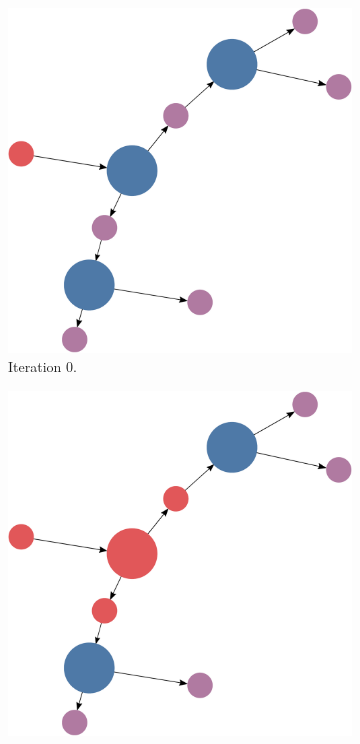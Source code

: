 \documentclass[titlepage,11pt]{article}
\begin{document}
\begin{figure}
	\begin{subfigure}[!htb]{0.32\textwidth}
		\centering
		\includegraphics[width=\columnwidth]{figures/knn_simple_forward_think_0.pdf}
		\caption{Iteration 0.}
	\end{subfigure}
	\begin{subfigure}[!htb]{0.32\textwidth}
		\centering
		\includegraphics[width=\columnwidth]{figures/knn_simple_forward_think_1.pdf}

\end{subfigure}
\end{figure}
\end{document}
